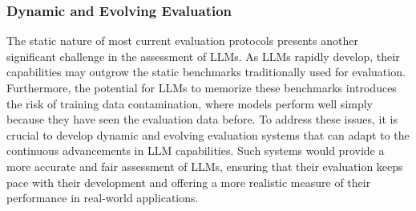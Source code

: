 \subsubsection{Dynamic and Evolving Evaluation}

The static nature of most current evaluation protocols presents another significant challenge in the assessment of LLMs. As LLMs rapidly develop, their capabilities may outgrow the static benchmarks traditionally used for evaluation. Furthermore, the potential for LLMs to memorize these benchmarks introduces the risk of training data contamination, where models perform well simply because they have seen the evaluation data before. To address these issues, it is crucial to develop dynamic and evolving evaluation systems that can adapt to the continuous advancements in LLM capabilities. Such systems would provide a more accurate and fair assessment of LLMs, ensuring that their evaluation keeps pace with their development and offering a more realistic measure of their performance in real-world applications.
